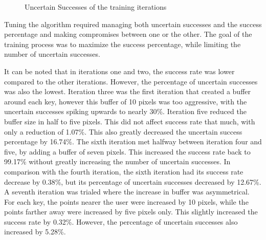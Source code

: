 \documentclass{report}
\begin{document}
\begin{figure}[H]
	\centering
	\caption{Uncertain Successes of the training iterations}
	\label{fig:rd-training-uncertain-successes}
\end{figure}


Tuning the algorithm required managing both uncertain successes and the success
percentage and making compromises between one or the other. The goal of the
training process was to maximize the success percentage, while limiting the
number of uncertain successes.

It can be noted that in iterations one and two, the success rate was lower
compared to the other iterations. However, the percentage of uncertain successes
was also the lowest. Iteration three was the first iteration that created a
buffer around each key, however this buffer of 10 pixels was too aggressive,
with the uncertain successes spiking upwards to nearly 30\%. Iteration five
reduced the buffer size in half to five pixels. This did not affect success rate
that much, with only a reduction of 1.07\%. This also greatly decreased the
uncertain success percentage by 16.74\%. The sixth iteration met halfway between
iteration four and five, by adding a buffer of seven pixels. This increased the
success rate back to 99.17\% without greatly increasing the number of uncertain
successes. In comparison with the fourth iteration, the sixth iteration had its
success rate decrease by 0.38\%, but its percentage of uncertain successes
decreased by 12.67\%. A seventh iteration was trialed where the increase in
buffer was asymmetrical. For each key, the points nearer the user were increased
by 10 pixels, while the points farther away were increased by five pixels only.
This slightly increased the success rate by 0.32\%. However, the percentage of
uncertain successes also increased by 5.28\%.
\end{document}
